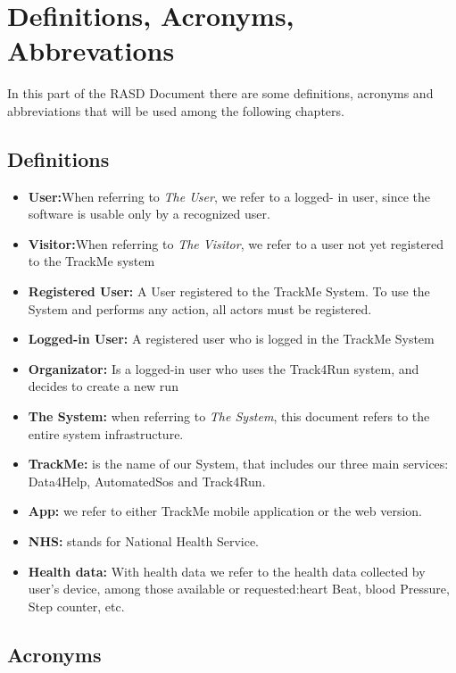 \section{Definitions, Acronyms, Abbrevations}
In this part of the RASD Document there are some definitions, acronyms and abbreviations that will be used among the following chapters.
\subsection{Definitions}
\begin{itemize}
\item \textbf{User:}When referring to \emph{The User}, we refer to a logged- in user, since the software is usable only by a recognized user. 

\item \textbf{Visitor:}When referring to \emph{The Visitor}, we refer to a user not yet registered to the TrackMe system

\item \textbf{Registered User:} A User registered to the TrackMe System. To use the System and performs any action, all actors must be registered. 

\item\textbf{Logged-in User:} A registered user who is logged in the TrackMe System

\item\textbf{Organizator:} Is a logged-in  user who uses the Track4Run system, and decides to create a new run
\item \textbf{The System:} when referring to \emph{The System}, this document refers to the entire system infrastructure.
\item\textbf{TrackMe:}
is the name of our System, that  includes our three main services: Data4Help, AutomatedSos and Track4Run.
\item\textbf{App:} we refer to either TrackMe mobile application or the web version.

\item\textbf{NHS:} stands for National Health Service.
\item\textbf{Health data:} With health data we refer to the health data collected by user's device, among those available or requested:heart Beat, blood Pressure, Step counter, etc. 



	
	\end{itemize}
\subsection{Acronyms}

